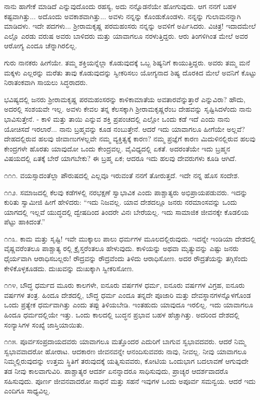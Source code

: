 ನಾನು ಹಾಗೇಕೆ ಮಾಡಿದೆ ಎನ್ನುವುದೊಂದು ರಹಸ್ಯ, ಅದು ನನ್ನೊಡನೆಯೇ ಹೋಗುವುದು. ಆಗ ನನಗೆ ಬಹಳ ಕಷ್ಟವಾಗಿತ್ತು... ಅದೊಂದು ಅವಕಾಶವಾಗಿತ್ತು... ಅವಳು ನನ್ನನ್ನು ಕೊಂಡುಕೊಂಡಳು. ನನ್ನನ್ನು ಗುಲಾಮನನ್ನಾಗಿ ಮಾಡಿದಳು. ಇದೇ ಪದಗಳು... ಶ‍್ರೀರಾಮಕೃಷ್ಣ ಪರಮಹಂಸರು ನನ್ನನ್ನು ಅವಳಿಗೆ ಅರ್ಪಿಸಿದರು. ವಿಚಿತ್ರ! ಇದಾದಮೇಲೆ ಎಲ್ಲೊ ಎರಡು ವರುಷ ಅವರು ಬಾಳಿದರು ಮತ್ತು ಯಾವಾಗಲೂ ನರಳುತ್ತಿದ್ದರು. ಆರು ತಿಂಗಳಿಗಿಂತ ಮೇಲೆ ಅವರ ಆರೋಗ್ಯ ಎಂದೂ ಚೆನ್ನಾಗಿರಲಿಲ್ಲ.

ಗುರು ನಾನಕರು ಹೀಗೆಯೇ. ತಮ್ಮ ಶಕ್ತಿಯನ್ನೆಲ್ಲಾ ಕೊಡುವುದಕ್ಕೆ ಒಬ್ಬ ಶಿಷ್ಯನಿಗೆ ಕಾಯುತ್ತಿದ್ದರು. ಅವರು ತಮ್ಮ ಮನೆ ಮಕ್ಕಳು ಎಲ್ಲರನ್ನು ಮರೆತು ತಾವು ಕೊಡುವುದನ್ನು ಸ್ವೀಕರಿಸಲು ಯೋಗ್ಯನಾದ ಶಿಷ್ಯ ದೊರಕಿದ ಮೇಲೆ ಅವನಿಗೆ ಕೊಟ್ಟು ನಿರಾತಂಕವಾಗಿ ಸಾಯಲು ಸಿದ್ಧರಾದರು.

ಭವಿಷ್ಯದಲ್ಲಿ ಜನರು ಶ‍್ರೀರಾಮಕೃಷ್ಣ ಪರಮಹಂಸರನ್ನು ಕಾಳಿಕಾಮಾತೆಯ ಅವತಾರವೆನ್ನುತ್ತಾರೆ ಎನ್ನುವಿರಾ? ಹೌದು, ಅದರಲ್ಲಿ ಸಂಶಯವೇ ಇಲ್ಲ. ಅವಳು ಕೇವಲ ತನ್ನ ಕೆಲಸಕ್ಕಾಗಿ ಶ‍್ರೀರಾಮಕೃಷ್ಣರೆಂಬ ದೇಹವನ್ನು ಸೃಷ್ಟಿಸಿದಳೆಂದು ನಾನು ಭಾವಿಸುತ್ತೇನೆ. - ಕಾಳಿ ಮತ್ತು ತಾಯಿ ಎನ್ನುವ ಶಕ್ತಿ ಪ್ರಪಂಚದಲ್ಲಿ ಎಲ್ಲೋ ಒಂದು ಕಡೆ ಇದೆ ಎಂದು ನಾನು ಯೋಚಿಸದೆ ಇರಲಾರೆ... ನಾನು ಬ್ರಹ್ಮವನ್ನು ಕೂಡ ನಂಬುತ್ತೇನೆ. ಆದರೆ ಇದು ಯಾವಾಗಲೂ ಹೀಗೆಯೇ ಅಲ್ಲವೆ? ದೇಹದಲ್ಲಿರುವ ಹಲವು ಜೀವಾಣುಗಳಲ್ಲವೇ ನಮ್ಮ ವ್ಯಕ್ತಿತ್ವಕ್ಕೆ ಕಾರಣ? ನಮ್ಮ ಪ್ರಜ್ಞೆಗೆ ಕಾರಣ ಮಿದುಳಿನಲ್ಲಿರುವ ಹಲವು ಕೇಂದ್ರಗಳೇ ಹೊರತು ಯಾವುದೋ ಒಂದು ಕೇಂದ್ರವಲ್ಲ. ವೈವಿಧ್ಯದಲ್ಲಿ ಏಕತೆ. ಅದರಂತೆಯೇ ಇದು ಬ್ರಹ್ಮನ ವಿಷಯದಲ್ಲಿ ಏತಕ್ಕೆ ಬೇರೆ ಯಾಗಬೇಕು? ಈ ಬ್ರಹ್ಮ ಏಕ; ಆದರೂ ಇದು ಹಲವು ದೇವರುಗಳು ಕೂಡಿ ಆಗಿದೆ.

೧೧೧. ವಯಸ್ಸಾದಂತೆಲ್ಲಾ ಪೌರುಷದಲ್ಲಿ ಎಲ್ಲವೂ ಇರುವಂತೆ ನನಗೆ ತೋರುತ್ತದೆ. ಇದೇ ನನ್ನ ಹೊಸ ಸಂದೇಶ.

೧೧೨. ಸಮಾಜದಲ್ಲಿ ಕೆಲವು ಕಡೆಗಳಲ್ಲಿ ನರಭಕ್ಷಣೆ ಸ್ವಾಭಾವಿಕ ಎಂದು ಪಾಶ್ಚಾತ್ಯರು ಅಭಿಪ್ರಾಯಪಡುವರು. ಇದನ್ನು ಕುರಿತು ಸ್ವಾಮೀಜಿ ಹೀಗೆ ಹೇಳಿದರು: “ಇದು ನಿಜವಲ್ಲ. ಯಾವ ದೇಶದಲ್ಲೂ ಜನರು ನರಮಾಂಸವನ್ನು ಒಂದು ಯಾಗದಲ್ಲಿ ಇಲ್ಲವೆ ಯುದ್ಧದಲ್ಲಿ ದ್ವೇಷದಿಂದ ತಿಂದರೇ ವಿನಃ ಬೇರೆಯಲ್ಲ. ಇದು ಸಾಮಾಜಿಕ ಜೀವನಕ್ಕೇ ಕೊಡಲಿಯ ಪೆಟ್ಟು ಹಾಕಿದಂತೆ.”

೧೧೩. ಕಾಮ ಮತ್ತು ಸೃಷ್ಟಿ! ಇವೇ ಮುಕ್ಕಾಲು ಪಾಲು ಧರ್ಮಗಳ ಮೂಲದಲ್ಲಿರುವುದು. ಇದನ್ನೇ ಇಂಡಿಯಾ ದೇಶದಲ್ಲಿ ವೈಷ್ಣವರೆಂತಲೂ ಪಾಶ್ಚಾತ್ಯ ರಲ್ಲಿ ಕ್ರೈಸ್ತರೆಂತಲೂ ಹೇಳುವುದು. ಕಾಳಿಯನ್ನು ಅಥವಾ ಮೃತ್ಯುವನ್ನು ಎಷ್ಟು ಜನರು ಧೈರ್ಯವಾಗಿ ಆರಾಧಿಸಬಲ್ಲರು! ರೌದ್ರವನ್ನು ರೌದ್ರವೆಂದು ತಿಳಿದು ಆರಾಧಿಸೋಣ. ಅದರ ರೌದ್ರತೆಯನ್ನು ತಗ್ಗಿಸೆಂದು ಕೇಳಿಕೊಳ್ಳಕೂಡದು. ದುಃಖವನ್ನು ದುಃಖಕ್ಕಾಗಿ ಸ್ವೀಕರಿಸೋಣ.

೧೧೪, ಬೌದ್ಧ ಧರ್ಮದ ಮೂರು ಕಾಲಗಳೇ, ಐನೂರು ವರ್ಷಗಳ ಧರ್ಮ, ಐನೂರು ವರ್ಷಗಳ ವಿಗ್ರಹ, ಐನೂರು ವರ್ಷಗಳ ತಂತ್ರ. ಹಿಂದೂ ದೇಶದಲ್ಲಿ, ಬೌದ್ಧ ಧರ್ಮ ಎಂದೂ ತನ್ನದೇ ಪೂಜಾರಿ ಮತ್ತು ದೇವಸ್ಥಾನಗಳನ್ನೊಳಗೊಂಡ ಒಂದು ಪ್ರತ್ಯೇಕ ಧರ್ಮವಾಗಿತ್ತು ಎಂದು ತಪ್ಪು ತಿಳಿಯಬೇಡಿ. ಇಂತಹುದು ಯಾವುದೂ ಇರಲಿಲ್ಲ. ಇದು ಯಾವಾಗಲೂ ಹಿಂದೂ ಧರ್ಮದಲ್ಲಿಯೇ ಇತ್ತು. ಒಂದು ಕಾಲದಲ್ಲಿ ಬುದ್ಧನ ಪ್ರಭಾವ ಬಹಳ ಹೆಚ್ಚಾಗಿತ್ತು. ಅದರಿಂದ ದೇಶದಲ್ಲಿ ಸಂನ್ಯಾಸಿಗಳ ಸಂಖ್ಯೆ ಜಾಸ್ತಿಯಾಯಿತು.

೧೧೫. ಪೂರ್ವಸಂಪ್ರದಾಯದವರು ಯಾವಾಗಲೂ ಮತ್ತೊಂದರ ಎದುರಿಗೆ ಬಾಗುವ ಸ್ವಭಾವದವರು. ಆದರೆ ನಿಮ್ಮ ಸ್ವಭಾವವಾದರೋ ಹೋರಾಟ. ಆದಕಾರಣ ಜೀವನವನ್ನೇ ಆನಂದಿಸುವವರು ನಾವು, ನೀವಲ್ಲ. ನೀವು ಯಾವಾಗಲೂ ನಿಮ್ಮಲ್ಲಿರುವುದನ್ನು ಉತ್ತಮ ಸ್ಥಿತಿಗೆ ತರುವುದಕ್ಕೆ ಯತ್ನಿಸುವವರು, ಕೋಟಿಯ ಒಂದುಭಾಗ ಬದಲಾವಣೆ ಆಗುವುದೇ ತಡ ನೀವು ಕಾಲವಾಗುವಿರಿ. ಪಾಶ್ಚಾತ್ಯರ ಆದರ್ಶ ಏನನ್ನಾದರೂ ಸಾಧಿಸುವುದು, ಪ್ರಾಚ್ಯರ ಆದರ್ಶವಾದರೊ ಸಹಿಸುವುದು. ಪೂರ್ಣ ಜೀವನವಾದರೋ ಸಾಧನೆ ಮತ್ತು ಸಹನೆ ಇವುಗಳ ಒಂದು ಅಪೂರ್ವ ಸಮನ್ವಯ. ಆದರೆ ಇದು ಎಂದಿಗೂ ಸಾಧ್ಯವಿಲ್ಲ.

